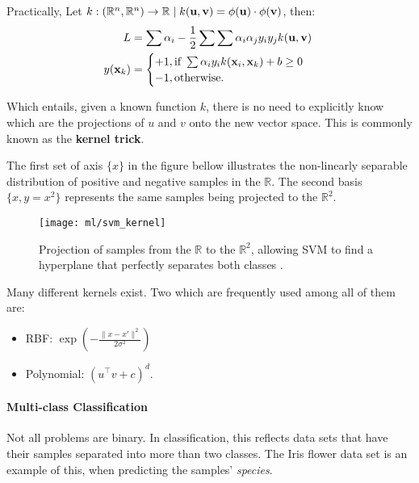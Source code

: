 \begin{remark}
	Practically, Let $k: (\mathbb{R}^n, \mathbb{R}^n) \rightarrow \mathbb{R} \mid k(\mathbf{u}, \mathbf{v}) = \phi(\mathbf{u}) \cdot \phi(\mathbf{v})$, then:
	\begin{align*}
	L &= \sum\alpha_i -\frac{1}{2}\sum\sum\alpha_i\alpha_j y_i y_j k(\mathbf{u}, \mathbf{v}) \\
	y(\mathbf{x}_k) &= \begin{cases}
			+1, \text{if } \sum\alpha_i y_i k(\mathbf{x}_i, \mathbf{x}_k) +b \geq 0\\
			-1, \text{otherwise.}
		\end{cases}
	\end{align*}
	
	Which entails, given a known function $k$, there is no need to explicitly know which are the projections of $u$ and $v$ onto the new vector space. This is commonly known as the \textbf{kernel trick}.
\end{remark}

The first set of axis $\{x\}$ in the figure bellow illustrates the non-linearly separable distribution of positive and negative samples in the $\mathbb{R}$. The second basis $\{x, y=x^2\}$ represents the same samples being projected to the $\mathbb{R}^2$.

\begin{figure}[H]
	\centering
	\captionsetup{justification=centering}

	\texttt{[image: ml/svm\_kernel]}
	\caption{Projection of samples from the $\mathbb{R}$ to the $\mathbb{R}^2$, allowing SVM to find a hyperplane that perfectly separates both classes \cite{svmkernels}.}
	\label{fig:svmkernel}
\end{figure}

Many different kernels exist. Two which are frequently used among all of them\cite{svmkernels} are:
\begin{itemize}
	\item RBF: $\exp(-\frac{\|x -x'\|^2}{2\sigma^2})$
	\item Polynomial: $(u^\top v + c)^{d}$.
\end{itemize}

\paragraph{Multi-class Classification}

Not all problems are binary. In classification, this reflects data sets that have their samples separated into more than two classes. The Iris flower data set is an example of this, when predicting the samples' {\em species}.

